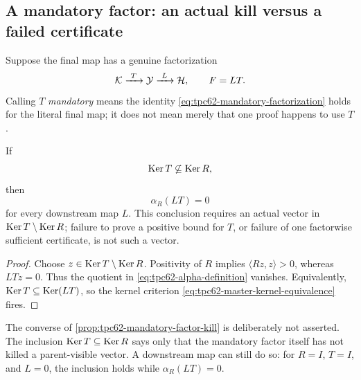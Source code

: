 \subsection{A mandatory factor: an actual kill versus a failed certificate}

Suppose the final map has a genuine factorization
\begin{equation}
 \cK\xrightarrow{\ T\ }\mathcal Y\xrightarrow{\ L\ }\cH,
 \qquad F=LT.
 \label{eq:tpc62-mandatory-factorization}
\end{equation}
Calling \(T\) \emph{mandatory} means the identity
\eqref{eq:tpc62-mandatory-factorization} holds for the literal final map;
it does not mean merely that one proof happens to use \(T\).

\begin{proposition}
\label{prop:tpc62-mandatory-factor-kill}
If
\begin{equation}
 \operatorname{Ker} T\not\subseteq\operatorname{Ker} R,
 \label{eq:tpc62-T-visible-kernel}
\end{equation}
then
\begin{equation}
 \alpha_R(LT)=0
 \label{eq:tpc62-T-kills-alpha}
\end{equation}
for every downstream map \(L\).  This conclusion requires an actual
vector in \(\operatorname{Ker} T\setminus\operatorname{Ker} R\); failure to prove a positive bound for
\(T\), or failure of one factorwise sufficient certificate, is not such a
vector.
\end{proposition}

\begin{proof}
Choose \(z\in\operatorname{Ker} T\setminus\operatorname{Ker} R\).  Positivity of \(R\) implies
\(\langle Rz,z\rangle>0\), whereas \(LTz=0\).  Thus the quotient in
\eqref{eq:tpc62-alpha-definition} vanishes.  Equivalently,
\(\operatorname{Ker} T\subseteq\operatorname{Ker}(LT)\), so the kernel criterion
\eqref{eq:tpc62-master-kernel-equivalence} fires.
\end{proof}

The converse of \cref{prop:tpc62-mandatory-factor-kill} is deliberately
not asserted.  The inclusion \(\operatorname{Ker} T\subseteq\operatorname{Ker} R\) says only that the
mandatory factor itself has not killed a parent-visible vector.  A
downstream map can still do so: for \(R=I\), \(T=I\), and \(L=0\), the
inclusion holds while \(\alpha_R(LT)=0\).

